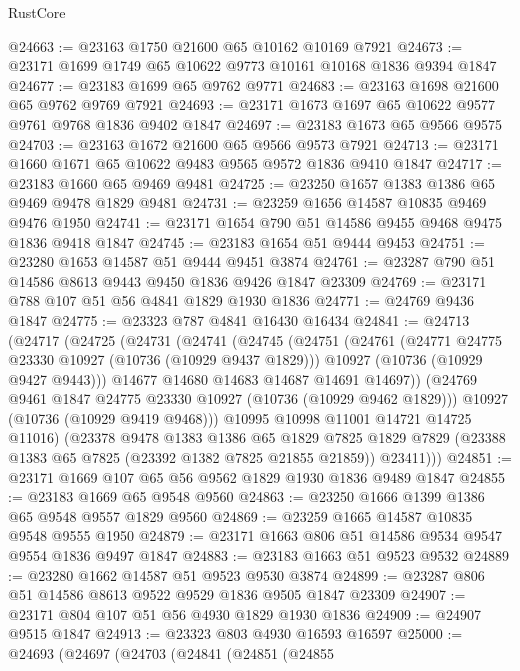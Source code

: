\begin{lexlean}{RustCore}
\begin{coremodule}
@24663 := @23163 @1750 @21600 @65 @10162 @10169 @7921
@24673 := @23171 @1699 @1749 @65 @10622 @9773 @10161 @10168 @1836 @9394 @1847
@24677 := @23183 @1699 @65 @9762 @9771
@24683 := @23163 @1698 @21600 @65 @9762 @9769 @7921
@24693 := @23171 @1673 @1697 @65 @10622 @9577 @9761 @9768 @1836 @9402 @1847
@24697 := @23183 @1673 @65 @9566 @9575
@24703 := @23163 @1672 @21600 @65 @9566 @9573 @7921
@24713 := @23171 @1660 @1671 @65 @10622 @9483 @9565 @9572 @1836 @9410 @1847
@24717 := @23183 @1660 @65 @9469 @9481
@24725 := @23250 @1657 @1383 @1386 @65 @9469 @9478 @1829 @9481
@24731 := @23259 @1656 @14587 @10835 @9469 @9476 @1950
@24741 := @23171 @1654 @790 @51 @14586 @9455 @9468 @9475 @1836 @9418 @1847
@24745 := @23183 @1654 @51 @9444 @9453
@24751 := @23280 @1653 @14587 @51 @9444 @9451 @3874
@24761 := @23287 @790 @51 @14586 @8613 @9443 @9450 @1836 @9426 @1847 @23309
@24769 := @23171 @788 @107 @51 @56 @4841 @1829 @1930 @1836
@24771 := @24769 @9436 @1847
@24775 := @23323 @787 @4841 @16430 @16434
@24841 := @24713
    (@24717
      (@24725
        (@24731
          (@24741
            (@24745
              (@24751
                (@24761
                  (@24771 @24775 @23330 @10927 (@10736 (@10929 @9437 @1829)))
                  @10927
                  (@10736 (@10929 @9427 @9443)))
                @14677
                @14680
                @14683
                @14687
                @14691
                @14697))
            (@24769 @9461 @1847 @24775 @23330 @10927 (@10736 (@10929 @9462 @1829)))
            @10927
            (@10736 (@10929 @9419 @9468)))
          @10995
          @10998
          @11001
          @14721
          @14725
          @11016)
        (@23378
          @9478
          @1383
          @1386
          @65
          @1829
          @7825
          @1829
          @7829
          (@23388 @1383 @65 @7825 (@23392 @1382 @7825 @21855 @21859))
          @23411)))
@24851 := @23171 @1669 @107 @65 @56 @9562 @1829 @1930 @1836 @9489 @1847
@24855 := @23183 @1669 @65 @9548 @9560
@24863 := @23250 @1666 @1399 @1386 @65 @9548 @9557 @1829 @9560
@24869 := @23259 @1665 @14587 @10835 @9548 @9555 @1950
@24879 := @23171 @1663 @806 @51 @14586 @9534 @9547 @9554 @1836 @9497 @1847
@24883 := @23183 @1663 @51 @9523 @9532
@24889 := @23280 @1662 @14587 @51 @9523 @9530 @3874
@24899 := @23287 @806 @51 @14586 @8613 @9522 @9529 @1836 @9505 @1847 @23309
@24907 := @23171 @804 @107 @51 @56 @4930 @1829 @1930 @1836
@24909 := @24907 @9515 @1847
@24913 := @23323 @803 @4930 @16593 @16597
@25000 := @24693
    (@24697
      (@24703
        (@24841
          (@24851
            (@24855

\end{coremodule}
\end{lexlean}
